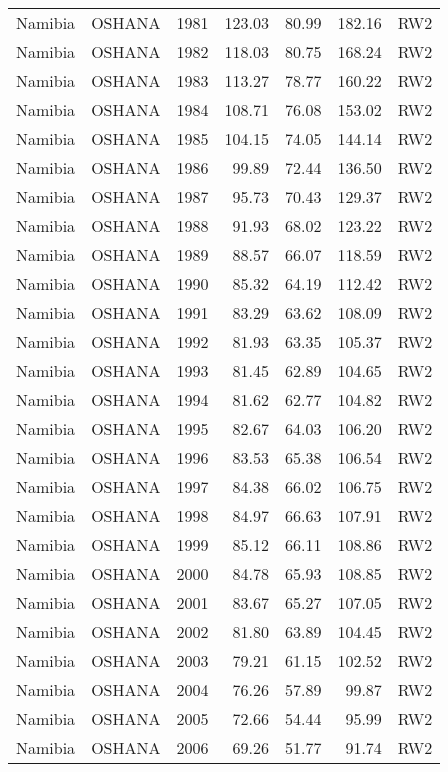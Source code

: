 \begin{longtable}{lllrrrl}
  Namibia & OSHANA & 1981 & 123.03 & 80.99 & 182.16 & RW2 \\ 
  Namibia & OSHANA & 1982 & 118.03 & 80.75 & 168.24 & RW2 \\ 
  Namibia & OSHANA & 1983 & 113.27 & 78.77 & 160.22 & RW2 \\ 
  Namibia & OSHANA & 1984 & 108.71 & 76.08 & 153.02 & RW2 \\ 
  Namibia & OSHANA & 1985 & 104.15 & 74.05 & 144.14 & RW2 \\ 
  Namibia & OSHANA & 1986 & 99.89 & 72.44 & 136.50 & RW2 \\ 
  Namibia & OSHANA & 1987 & 95.73 & 70.43 & 129.37 & RW2 \\ 
  Namibia & OSHANA & 1988 & 91.93 & 68.02 & 123.22 & RW2 \\ 
  Namibia & OSHANA & 1989 & 88.57 & 66.07 & 118.59 & RW2 \\ 
  Namibia & OSHANA & 1990 & 85.32 & 64.19 & 112.42 & RW2 \\ 
  Namibia & OSHANA & 1991 & 83.29 & 63.62 & 108.09 & RW2 \\ 
  Namibia & OSHANA & 1992 & 81.93 & 63.35 & 105.37 & RW2 \\ 
  Namibia & OSHANA & 1993 & 81.45 & 62.89 & 104.65 & RW2 \\ 
  Namibia & OSHANA & 1994 & 81.62 & 62.77 & 104.82 & RW2 \\ 
  Namibia & OSHANA & 1995 & 82.67 & 64.03 & 106.20 & RW2 \\ 
  Namibia & OSHANA & 1996 & 83.53 & 65.38 & 106.54 & RW2 \\ 
  Namibia & OSHANA & 1997 & 84.38 & 66.02 & 106.75 & RW2 \\ 
  Namibia & OSHANA & 1998 & 84.97 & 66.63 & 107.91 & RW2 \\ 
  Namibia & OSHANA & 1999 & 85.12 & 66.11 & 108.86 & RW2 \\ 
  Namibia & OSHANA & 2000 & 84.78 & 65.93 & 108.85 & RW2 \\ 
  Namibia & OSHANA & 2001 & 83.67 & 65.27 & 107.05 & RW2 \\ 
  Namibia & OSHANA & 2002 & 81.80 & 63.89 & 104.45 & RW2 \\ 
  Namibia & OSHANA & 2003 & 79.21 & 61.15 & 102.52 & RW2 \\ 
  Namibia & OSHANA & 2004 & 76.26 & 57.89 & 99.87 & RW2 \\ 
  Namibia & OSHANA & 2005 & 72.66 & 54.44 & 95.99 & RW2 \\ 
  Namibia & OSHANA & 2006 & 69.26 & 51.77 & 91.74 & RW2 \\ 

\end{longtable}
